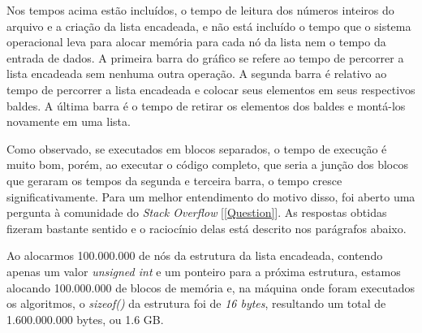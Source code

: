 \documentclass[fleqn,10pt]{SelfArx} %
\begin{document}
{\setlength{\parindent}{-0.5em}
}\newline

Nos tempos acima estão incluídos, o tempo de leitura dos números inteiros do arquivo e a criação da lista encadeada, e 
não está incluído o tempo que o sistema operacional leva para alocar memória para cada nó da lista nem o tempo 
da entrada de dados.
A primeira barra do gráfico se refere ao tempo de percorrer a lista encadeada sem nenhuma outra operação. A segunda 
barra é relativo ao tempo de percorrer a lista encadeada e colocar seus elementos em seus respectivos baldes. A última 
barra é o tempo de retirar os elementos dos baldes e montá-los novamente em uma lista.

Como observado, se executados em blocos separados, o tempo de execução é muito bom, porém, ao executar o código completo, 
que seria a junção dos blocos que geraram os tempos da segunda e terceira barra, o tempo cresce significativamente. 
Para um melhor entendimento do motivo disso, foi aberto uma pergunta à comunidade 
do \emph{Stack Overflow} [\ref{Question}]. 
As respostas obtidas fizeram bastante sentido e o raciocínio delas está descrito nos parágrafos abaixo.

Ao alocarmos 100.000.000 de nós da estrutura da lista encadeada, contendo apenas um valor \emph{unsigned int} e um 
ponteiro para a próxima estrutura, estamos alocando 100.000.000 de blocos de memória e, na máquina onde foram executados 
os algoritmos, o \emph{sizeof()} da estrutura foi de \emph{16 bytes}, resultando um total de 1.600.000.000 bytes, 
ou 1.6 GB. 
\end{document}
